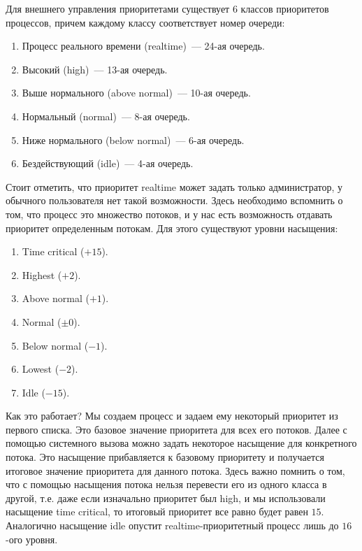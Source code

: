 Для внешнего управления приоритетами существует \(6\) классов приоритетов
процессов, причем каждому классу соответствует номер очереди:

\begin{enumerate}
\item
  Процесс реального времени (realtime)~--- 24-ая очередь.

\item
  Высокий (high)~--- 13-ая очередь.

\item
  Выше нормального (above normal)~--- 10-ая очередь.

\item
  Нормальный (normal)~--- 8-ая очередь.

\item
  Ниже нормального (below normal)~--- 6-ая очередь.

\item
  Бездействующий (idle)~--- 4-ая очередь.
\end{enumerate}

Стоит отметить, что приоритет realtime может задать только администратор, у
обычного пользователя нет такой возможности. Здесь необходимо вспомнить о том,
что процесс это множество потоков, и у нас есть возможность отдавать приоритет
определенным потокам. Для этого существуют уровни насыщения:

\begin{enumerate}
\item
  Time critical (\(+15\)).

\item
  Highest (\(+2\)).

\item
  Above normal (\(+1\)).

\item
  Normal (\(\pm 0\)).

\item
  Below normal (\(-1\)).

\item
  Lowest (\(-2\)).

\item
  Idle (\(-15\)).
\end{enumerate}

Как это работает? Мы создаем процесс и задаем ему некоторый приоритет из первого
списка. Это базовое значение приоритета для всех его потоков. Далее с помощью
системного вызова можно задать некоторое насыщение для конкретного потока. Это
насыщение прибавляется к базовому приоритету и получается итоговое значение
приоритета для данного потока. Здесь важно помнить о том, что с помощью
насыщения потока нельзя перевести его из одного класса в другой, т.е. даже если
изначально приоритет был high, и мы использовали насыщение time critical, то
итоговый приоритет все равно будет равен \(15\). Аналогично насыщение idle
опустит realtime-приоритетный процесс лишь до \(16\)-ого уровня.

